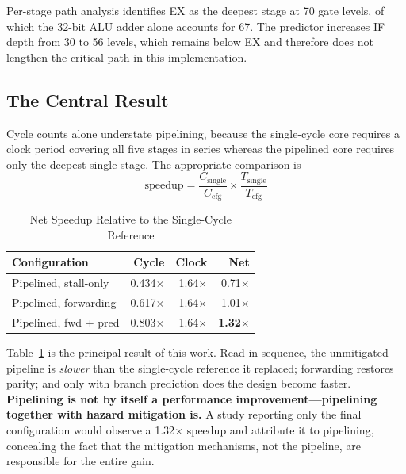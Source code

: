 \documentclass[conference]{IEEEtran}
\begin{document}
Per-stage path analysis identifies EX as the deepest stage at 70 gate
levels, of which the 32-bit ALU adder alone accounts for 67. The predictor
increases IF depth from 30 to 56 levels, which remains below EX and
therefore does not lengthen the critical path in this implementation.

\subsection{The Central Result}

Cycle counts alone understate pipelining, because the single-cycle core
requires a clock period covering all five stages in series whereas the
pipelined core requires only the deepest single stage. The appropriate
comparison is
\begin{equation}
\text{speedup} = \frac{C_{\text{single}}}{C_{\text{cfg}}}
                 \times \frac{T_{\text{single}}}{T_{\text{cfg}}}
\label{eq:speedup}
\end{equation}

\begin{table}[htbp]
\caption{Net Speedup Relative to the Single-Cycle Reference}
\begin{center}
\begin{tabular}{lrrr}
\toprule
\textbf{Configuration} & \textbf{Cycle} & \textbf{Clock} & \textbf{Net} \\
\midrule
Pipelined, stall-only & 0.434$\times$ & 1.64$\times$ & 0.71$\times$ \\
Pipelined, forwarding & 0.617$\times$ & 1.64$\times$ & 1.01$\times$ \\
Pipelined, fwd + pred & 0.803$\times$ & 1.64$\times$ & \textbf{1.32}$\times$ \\
\bottomrule
\end{tabular}
\label{tab:speedup}
\end{center}
\end{table}

Table~\ref{tab:speedup} is the principal result of this work. Read in
sequence, the unmitigated pipeline is \emph{slower} than the single-cycle
reference it replaced; forwarding restores parity; and only with branch
prediction does the design become faster. \textbf{Pipelining is not by
itself a performance improvement---pipelining together with hazard
mitigation is.} A study reporting only the final configuration would
observe a 1.32$\times$ speedup and attribute it to pipelining, concealing
the fact that the mitigation mechanisms, not the pipeline, are responsible
for the entire gain.
\end{document}
